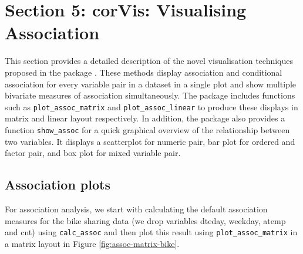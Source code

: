 \hypertarget{section-5-corvis-visualising-association}{%
\section{Section 5: corVis: Visualising
Association}\label{section-5-corvis-visualising-association}}

This section provides a detailed description of the novel visualisation
techniques proposed in the package . These methods
display association and conditional association for every variable pair
in a dataset in a single plot and show multiple bivariate measures of
association simultaneously. The package includes functions such as
\texttt{plot\_assoc\_matrix} and \texttt{plot\_assoc\_linear} to produce
these displays in matrix and linear layout respectively. In addition,
the package also provides a function \texttt{show\_assoc} for a quick
graphical overview of the relationship between two variables. It
displays a scatterplot for numeric pair, bar plot for ordered and factor
pair, and box plot for mixed variable pair.

\hypertarget{association-plots}{%
\subsection{Association plots}\label{association-plots}}

For association analysis, we start with calculating the default
association measures for the bike sharing data (we drop variables
dteday, weekday, atemp and cnt) using \texttt{calc\_assoc} and then plot
this result using \texttt{plot\_assoc\_matrix} in a matrix layout in
Figure \ref{fig:assoc-matrix-bike}.

